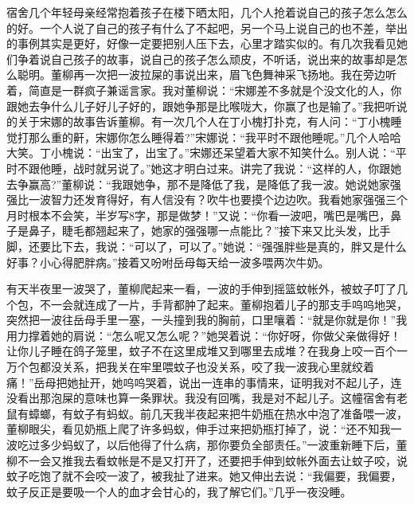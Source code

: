\documentclass[12pt,oneside]{book}
\begin{document}
宿舍几个年轻母亲经常抱着孩子在楼下晒太阳，几个人抢着说自己的孩子怎么怎么的好。一个人说了自己的孩子有什么了不起吧，另一个马上说自己的也不差，举出的事例其实是更好，好像一定要把别人压下去，心里才踏实似的。有几次我看见她们争着说自己孩子的故事，说自己的孩子怎么顽皮，不听话，说出来的故事却是怎么聪明。董柳再一次把一波拉屎的事说出来，眉飞色舞神采飞扬地。我在旁边听着，简直是一群疯子兼谣言家。我对董柳说：``宋娜差不多就是个没文化的人，你跟她去争什么儿子好儿子好的，跟她争那是比喉咙大，你赢了也是输了。''我把听说的关于宋娜的故事告诉董柳。有一次几个人在丁小槐打扑克，有人问：``丁小槐睡觉打那么重的鼾，宋娜你怎么睡得着?''宋娜说：``我平时不跟他睡呢。''几个人哈哈大笑。丁小槐说：``出宝了，出宝了。''宋娜还呆望着大家不知笑什么。别人说：``平时不跟他睡，战时就另说了。''她这才明白过来。讲完了我说：``这样的人，你跟她去争赢高?''董柳说：``我跟她争，那不是降低了我，是降低了我一波。她说她家强强比一波智力还发育得好，有人信没有？吹牛也要摸个边边吹。我看她家强强三个月时根本不会笑，半岁写8字，那是做梦！''又说：``你看一波吧，嘴巴是嘴巴，鼻子是鼻子，睫毛都翘起来了，她家的强强哪一点能比？''接下来又比头发，比手脚，还要比下去，我说：``可以了，可以了。''她说：``强强胖些是真的，胖又是什么好事？小心得肥胖病。''接着又吩咐岳母每天给一波多喂两次牛奶。

有天半夜里一波哭了，董柳爬起来一看，一波的手伸到摇篮蚊帐外，被蚊子叮了几个包，不一会就连成了一片，手背都肿了起来。董柳抱着儿子的那支手呜呜地哭，突然把一波往岳母手里一塞，一头撞到我的胸前，口里嚷着：``就是你就是你！''我用力撑着她的肩说：``怎么呢又怎么呢？''她哭着说：``你好呀，你做父亲做得好！让你儿子睡在鸽子笼里，蚊子不在这里成堆又到哪里去成堆？在我身上咬一百个一万个包都没关系，把我关在牢里喂蚊子也没关系，咬了我一波我心里就绞着痛！''岳母把她扯开，她呜呜哭着，说出一连串的事情来，证明我对不起儿子，连没看出那泡屎的意味也算一条罪状。我没有回嘴，我是对不起儿子。这幢宿舍有老鼠有蟑螂，有蚊子有蚂蚁。前几天我半夜起来把牛奶瓶在热水中泡了准备喂一波，董柳眼尖，看见奶瓶上爬了许多蚂蚁，伸手过来把奶瓶打掉了，说：``还不知我一波吃过多少蚂蚁了，以后他得了什么病，那你要负全部责任。''一波重新睡下后，董柳不一会又推我去看蚊帐是不是又打开了，还要把手伸到蚊帐外面去让蚊子咬，说蚊子吃饱了就不会咬一波了，被我扯了进来。她又伸出去说：``我偏要，我偏要，蚊子反正是要吸一个人的血才会甘心的，我了解它们。''几乎一夜没睡。
\end{document}
